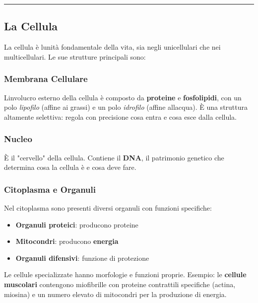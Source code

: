 \documentclass[a4paper,11pt]{article}
\providecommand{\tightlist}{%
  \setlength{\itemsep}{0pt}\setlength{\parskip}{0pt}}
\begin{document}
\begin{center}\rule{0.5\linewidth}{0.5pt}\end{center}

\subsection{La Cellula}\label{la-cellula}

La cellula è l\textquotesingle unità fondamentale della vita, sia negli
unicellulari che nei multicellulari. Le sue strutture principali sono:

\subsubsection{Membrana Cellulare}\label{membrana-cellulare}

L\textquotesingle involucro esterno della cellula è composto da
\textbf{proteine} e \textbf{fosfolipidi}, con un polo \emph{lipofilo}
(affine ai grassi) e un polo \emph{idrofilo} (affine
all\textquotesingle acqua). È una struttura altamente selettiva: regola
con precisione cosa entra e cosa esce dalla cellula.

\subsubsection{Nucleo}\label{nucleo}

È il "cervello" della cellula. Contiene il \textbf{DNA}, il patrimonio
genetico che determina cosa la cellula è e cosa deve fare.

\subsubsection{Citoplasma e Organuli}\label{citoplasma-e-organuli}

Nel citoplasma sono presenti diversi organuli con funzioni specifiche:

\begin{itemize}
      \tightlist
      \item
            \textbf{Organuli proteici}: producono proteine
      \item
            \textbf{Mitocondri}: producono \textbf{energia}
      \item
            \textbf{Organuli difensivi}: funzione di protezione
\end{itemize}

Le cellule specializzate hanno morfologie e funzioni proprie. Esempio:
le \textbf{cellule muscolari} contengono miofibrille con proteine
contrattili specifiche (actina, miosina) e un numero elevato di
mitocondri per la produzione di energia.
\end{document}
